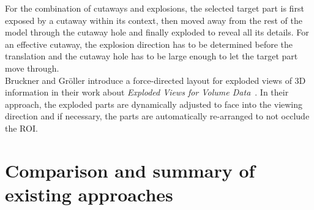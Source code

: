 For the combination of cutaways and explosions, the selected target part is first exposed by a cutaway within its context, then moved away from the rest of the model through the cutaway hole and finally exploded to reveal all its details. For an effective cutaway, the explosion direction has to be determined before the translation and the cutaway hole has to be large enough to let the target part move through.\\
\newline
Bruckner and Gr{\"o}ller introduce a force-directed layout for exploded views of 3D information in their work about \emph{Exploded Views for Volume Data}~\cite{jour:explodedView}. In their approach, the exploded parts are dynamically adjusted to face into the viewing direction and if necessary, the parts are automatically re-arranged to not occlude the ROI. 



\section{Comparison and summary of existing approaches}


